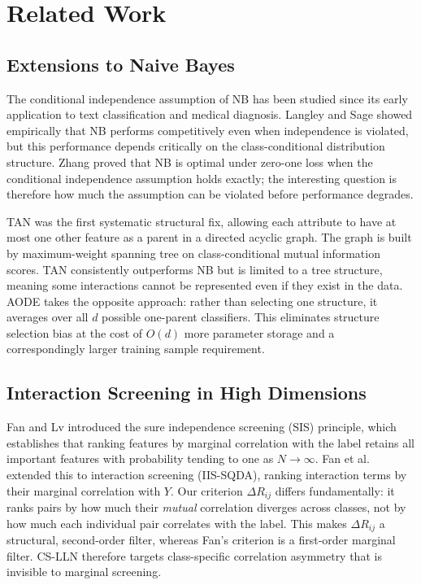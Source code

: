 \documentclass[conference]{IEEEtran}
\begin{document}
\section{Related Work}
\label{sec:related}

\subsection{Extensions to Naive Bayes}

The conditional independence assumption of NB has been studied since its
early application to text classification and medical diagnosis.
Langley and Sage \cite{langley1994} showed empirically that NB performs
competitively even when independence is violated, but this performance
depends critically on the class-conditional distribution structure.
Zhang \cite{zhang2004} proved that NB is optimal under zero-one loss
when the conditional independence assumption holds exactly; the interesting
question is therefore how much the assumption can be violated before
performance degrades.

TAN \cite{friedman1997} was the first systematic structural fix, allowing
each attribute to have at most one other feature as a parent in a directed
acyclic graph.
The graph is built by maximum-weight spanning tree on class-conditional
mutual information scores.
TAN consistently outperforms NB but is limited to a tree structure,
meaning some interactions cannot be represented even if they exist in the data.
AODE \cite{webb2005} takes the opposite approach: rather than selecting
one structure, it averages over all $d$ possible one-parent classifiers.
This eliminates structure selection bias at the cost of $O(d)$ more
parameter storage and a correspondingly larger training sample requirement.

\subsection{Interaction Screening in High Dimensions}

Fan and Lv \cite{fanLv2008} introduced the sure independence screening (SIS)
principle, which establishes that ranking features by marginal correlation
with the label retains all important features with probability tending to one
as $N \to \infty$.
Fan et al.\ \cite{fan2015} extended this to interaction screening (IIS-SQDA),
ranking interaction terms by their marginal correlation with $Y$.
Our criterion $\Delta R_{ij}$ differs fundamentally: it ranks pairs by how
much their \emph{mutual} correlation diverges across classes, not by how
much each individual pair correlates with the label.
This makes $\Delta R_{ij}$ a structural, second-order filter, whereas Fan's
criterion is a first-order marginal filter.
CS-LLN therefore targets class-specific correlation asymmetry that is
invisible to marginal screening.
\end{document}
